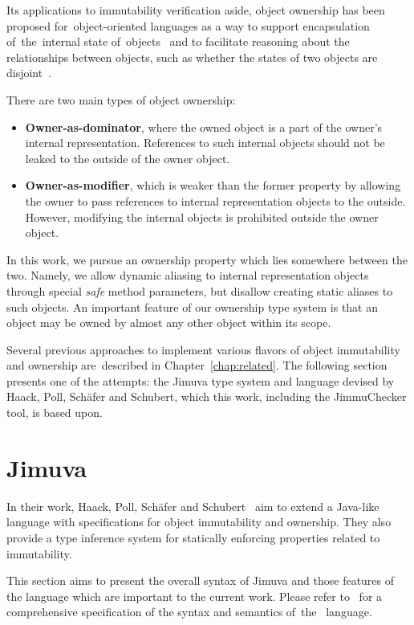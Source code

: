 \documentclass{pracamgr}
\theoremstyle{break}
\theoremstyle{break}
\theoremstyle{break}
\begin{document}
Its applications to immutability verification aside, object ownership
has been proposed for~object-oriented languages as a way to support
encapsulation of~the~internal state of~objects~\cite{own-encap} and to
facilitate reasoning about the relationships between objects, such as
whether the states of two objects are disjoint~\cite{disjointness}.

There are two main types of object ownership:
\begin{itemize}
\item \textbf{Owner-as-dominator}, where the owned object is a part of
  the owner's internal representation. References to such internal
  objects should not be leaked to the outside of the owner object. 
\item \textbf{Owner-as-modifier}, which is weaker than the former
  property by allowing the owner to pass references to internal
  representation objects to the outside. However, modifying the
  internal objects is prohibited outside the owner object. 
\end{itemize}
In this work, we pursue an ownership property which lies somewhere
between the two. Namely, we allow dynamic aliasing to internal
representation objects through special \emph{safe} method parameters,
but disallow creating static aliases to such objects. An important
feature of our ownership type system is that an object may be owned by
almost any other object within its scope.

Several previous approaches to implement various flavors of object
immutability and ownership are~described in
Chapter~\ref{chap:related}. The following section presents one of the
attempts: the Jimuva type system and language devised by Haack, Poll,
Schäfer and Schubert, which this work, including the JimmuChecker
tool, is based upon.

\section{Jimuva}
\label{sec:jimuva}

In their work, Haack, Poll, Schäfer and Schubert~\cite{haack} aim to
extend a Java-like language with specifications for object
immutability and ownership. They also provide a type inference system
for statically enforcing properties related to immutability.

This section aims to present the overall syntax of Jimuva and those
features of the language which are important to the current
work. Please refer to~\cite{haack} for a comprehensive specification
of the syntax and semantics of~the~ language.
\end{document}
